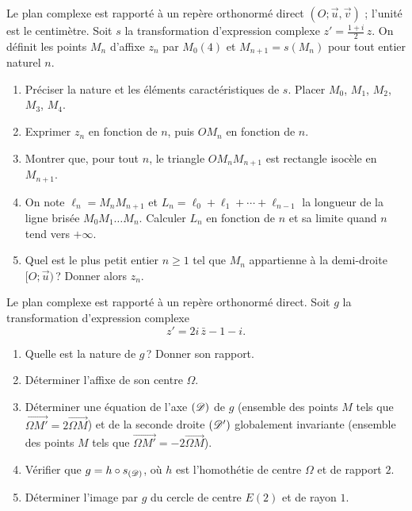 \begin{exo}\label{exo:sim-spirale}
      Le plan complexe est rapporté à un repère orthonormé direct $(O;\vec{u},\vec{v})$ ; l'unité est le centimètre.
      Soit $s$ la transformation d'expression complexe $z' = \frac{1+i}{2}\, z$.
      On définit les points $M_n$ d'affixe $z_n$ par $M_0(4)$ et $M_{n+1} = s(M_n)$ pour tout entier naturel $n$.
      \begin{enumerate}
            \item Préciser la nature et les éléments caractéristiques de $s$. Placer $M_0$, $M_1$, $M_2$, $M_3$, $M_4$.
            \item Exprimer $z_n$ en fonction de $n$, puis $OM_n$ en fonction de $n$.
            \item Montrer que, pour tout $n$, le triangle $OM_nM_{n+1}$ est rectangle isocèle en $M_{n+1}$.
            \item On note $\ell_n = M_nM_{n+1}$ et $L_n = \ell_0 + \ell_1 + \cdots + \ell_{n-1}$ la longueur de la ligne brisée $M_0M_1\ldots M_n$.
                  Calculer $L_n$ en fonction de $n$ et sa limite quand $n$ tend vers $+\infty$.
            \item Quel est le plus petit entier $n \geq 1$ tel que $M_n$ appartienne à la demi-droite $[O;\vec{u})$\,? Donner alors $z_n$.
      \end{enumerate}
\end{exo}
\begin{exo}\label{exo:sim-indirecte}
      Le plan complexe est rapporté à un repère orthonormé direct. Soit $g$ la transformation d'expression complexe
      \[ z' = 2i\,\bar{z} - 1 - i . \]
      \begin{enumerate}
            \item Quelle est la nature de $g$\,? Donner son rapport.
            \item Déterminer l'affixe de son centre $\Omega$.
            \item Déterminer une équation de l'axe $(\mathscr{D})$ de $g$ (ensemble des points $M$ tels que $\overrightarrow{\Omega M'} = 2\overrightarrow{\Omega M}$)
                  et de la seconde droite $(\mathscr{D}')$ globalement invariante (ensemble des points $M$ tels que $\overrightarrow{\Omega M'} = -2\overrightarrow{\Omega M}$).
            \item Vérifier que $g = h \circ s_{(\mathscr{D})}$, où $h$ est l'homothétie de centre $\Omega$ et de rapport $2$.
            \item Déterminer l'image par $g$ du cercle de centre $E(2)$ et de rayon $1$.
      \end{enumerate}
\end{exo}
